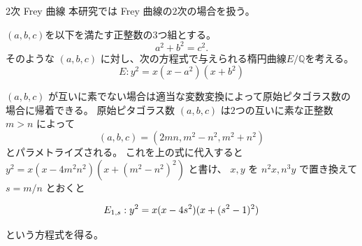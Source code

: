 \documentclass{classes/mybeamer}
\begin{document}


\begin{frame}{2次 Frey 曲線}
    本研究では Frey 曲線の$2$次の場合を扱う。
    \begin{dfn*}
        $(a,b,c)$を以下を満たす正整数の$3$つ組とする。
        \begin{equation*}
            \label{eq:pythagorean_triple}
            a^2+b^2=c^2.
        \end{equation*}
        そのような $(a,b,c)$ に対し、次の方程式で与えられる楕円曲線$E/\mathbb{Q}$を考える。
        \begin{equation*}
            \label{eq:2frey}
            E: y^2 = x (x-a^2) (x+b^2)
        \end{equation*}
    \end{dfn*}
    $(a,b,c)$ が互いに素でない場合は適当な変数変換によって原始ピタゴラス数の場合に帰着できる。
    原始ピタゴラス数 $(a,b,c)$ は$2$つの互いに素な正整数 $m > n$ によって
    \begin{equation*}
        (a,b,c) = (2mn, m^{2} - n^{2}, m^{2} + n^{2})
    \end{equation*}
    とパラメトライズされる。
    これを上の式に代入すると $y^{2} = x(x - 4m^2n^2)(x + (m^{2} - n^2)^{2})$ と書け、
    $x,y$ を $n^2x, n^3y$ で置き換えて $s = m/n$ とおくと
    \begin{eg*}
        \begin{equation*}
            \label{eq:E_{1,s}}
            E_{1,s}: y^{2} = x(x - 4s^{2})(x + (s^{2} - 1)^{2})
        \end{equation*}
    \end{eg*}
    という方程式を得る。    
\end{frame}
\end{document}
